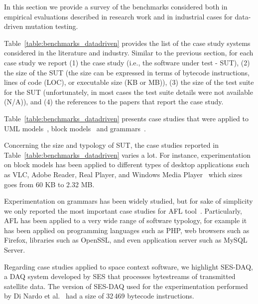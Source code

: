 In this section we provide a survey of the benchmarks considered both in empirical evaluations described in research work and in industrial cases for data-driven mutation testing.

Table~\ref{table:benchmarks_datadriven} provides the list of the case study systems considered in the literature and industry. Similar to the previous section, for each case study we report (1) the case study (i.e., the software under test - SUT), (2) the size of the SUT (the size can be expressed in terms of bytecode instructions, lines of code (LOC), or executable size (KB or MB)), (3) the size of the test suite for the SUT (unfortunately, in most cases the test suite details were not available (N/A)), and (4) the references to the papers that report the case study.

Table~\ref{table:benchmarks_datadriven} presents case studies that were applied to UML models~\cite{di2017augmenting}, block models~\cite{pham2016model} and grammars~\cite{AFL:industrialcases}.

Concerning the size and typology of SUT, the case studies reported in Table~\ref{table:benchmarks_datadriven} varies a lot.
For instance, experimentation on block models has been applied to different types of desktop applications such as VLC, Adobe Reader, Real Player, and Windows Media Player~\cite{pham2016model} which sizes goes from 60 KB to 2.32 MB. 

Experimentation on grammars has been widely studied, but for sake of simplicity we only reported the most important case studies for AFL tool~\cite{AFL:industrialcases}. Particularly, AFL has been applied to a very wide range of software typology, for example it has been applied on programming languages such as PHP, web browsers such as Firefox, libraries such as OpenSSL, and even application server such as MySQL Server. 

Regarding case studies applied to space context software, we highlight SES-DAQ, a DAQ system developed by SES that processes bytestreams of transmitted satellite data. The version of SES-DAQ used for the experimentation performed by Di Nardo et al.~\cite{di2017augmenting} had a size of 32\,469 bytecode instructions.




